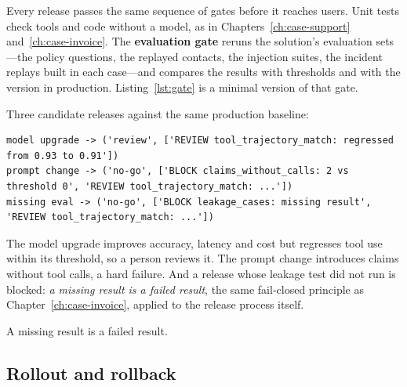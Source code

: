 Every release passes the same sequence of gates before it reaches users. Unit tests check tools and code without a model, as in Chapters~\ref{ch:case-support} and~\ref{ch:case-invoice}. The \textbf{evaluation gate} reruns the solution's evaluation sets---the policy questions, the replayed contacts, the injection suites, the incident replays built in each case---and compares the results with thresholds and with the version in production. Listing~\ref{lst:gate} is a minimal version of that gate.



Three candidate releases against the same production baseline:
\begin{lstlisting}[language={}, numbers=none, frame=none, xleftmargin=0em, basicstyle=\ttfamily\scriptsize]
model upgrade -> ('review', ['REVIEW tool_trajectory_match: regressed from 0.93 to 0.91'])
prompt change -> ('no-go', ['BLOCK claims_without_calls: 2 vs threshold 0', 'REVIEW tool_trajectory_match: ...'])
missing eval -> ('no-go', ['BLOCK leakage_cases: missing result', 'REVIEW tool_trajectory_match: ...'])
\end{lstlisting}
The model upgrade improves accuracy, latency and cost but regresses tool use within its threshold, so a person reviews it. The prompt change introduces claims without tool calls, a hard failure. And a release whose leakage test did not run is blocked: \emph{a missing result is a failed result}, the same fail-closed principle as Chapter~\ref{ch:case-invoice}, applied to the release process itself.

\begin{keyidea}
A missing result is a failed result.
\end{keyidea}

\subsection{Rollout and rollback}

